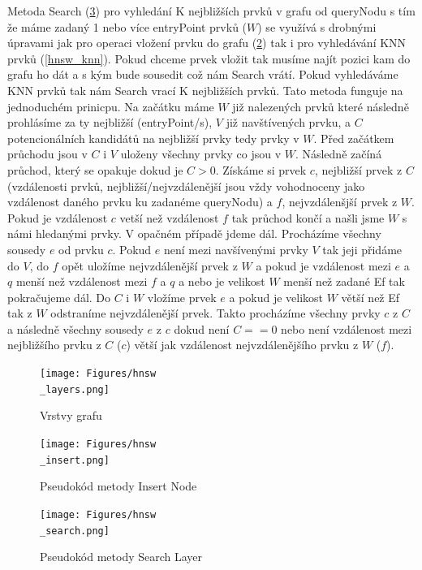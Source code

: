 \documentclass[czech,semestral,dept460,male,csharp,cpdeclaration]{diploma}
\begin{document}
		Metoda Search (\ref{hnsw_search}) pro vyhledání K nejbližších prvků v grafu od queryNodu s tím že máme zadaný 1 nebo více entryPoint prvků ($W$) se využívá s drobnými úpravami jak pro operaci vložení prvku do grafu (\ref{hnsw_insert}) tak i pro vyhledávání KNN prvků (\ref{hnsw_knn}). Pokud chceme prvek vložit tak musíme najít pozici kam do grafu ho dát a s kým bude sousedit což nám Search vrátí. Pokud vyhledáváme KNN prvků tak nám Search vrací K nejbližších prvků. Tato metoda funguje na jednoduchém prinicpu. Na začátku máme $W$ již nalezených prvků které následně prohlásíme za ty nejbližší (entryPoint/s), $V$ již navštívených prvku, a $C$ potencionálních kandidátů na nejbližší prvky tedy prvky v $W$. Před začátkem průchodu jsou v $C$ i $V$ uloženy všechny prvky co jsou v $W$. Následně začíná průchod, který se opakuje dokud je $C > 0$. Získáme si prvek $c$, nejbližší prvek z $C$ (vzdálenosti prvků, nejbližší/nejvzdálenější jsou vždy vohodnoceny jako vzdálenost daného prvku ku zadanéme queryNodu) a $f$, nejvzdálenšjší prvek z $W$. Pokud je vzdálenost $c$ vetší než vzdálenost $f$ tak průchod končí a našli jsme $W$ s námi hledanými prvky. V opačném případě jdeme dál. Procházíme všechny sousedy $e$ od prvku $c$. Pokud $e$ není mezi navšívenými prvky $V$ tak jeji přidáme do $V$, do $f$ opět uložíme nejvzdálenější prvek z $W$ a pokud je vzdálenost mezi $e$ a $q$ menší než vzdálenost mezi $f$ a $q$ a nebo je velikost $W$ menší než zadané Ef tak pokračujeme dál. Do $C$ i $W$ vložíme prvek $e$ a pokud je velikost $W$ větší než Ef tak z $W$ odstraníme nejvzdálenější prvek. Takto procházíme všechny prvky $c$ z $C$ a následně všechny sousedy $e$ z $c$ dokud není $C == 0$ nebo není vzdálenost mezi nejbližšího prvku z $C$ ($c$) větší jak vzdálenost nejvzdálenějšího prvku z $W$ ($f$).
		
		\begin{figure}
			\centering
			\texttt{[image: Figures/hnsw\\\_layers.png]}
			\caption{Vrstvy grafu}
			\label{hnsw_layers}
		\end{figure}
		
		\begin{figure}
			\centering
			\texttt{[image: Figures/hnsw\\\_insert.png]}
			\caption{Pseudokód metody Insert Node}
			\label{hnsw_insert}
		\end{figure}
		
		\begin{figure}
			\centering
			\texttt{[image: Figures/hnsw\\\_search.png]}
			\caption{Pseudokód metody Search Layer}
			\label{hnsw_search}
		\end{figure}
		
\end{document}
